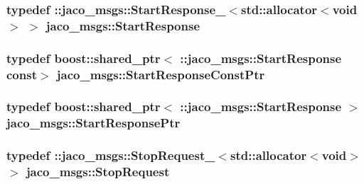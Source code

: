 \subsubsection[{\texorpdfstring{Start\+Response}{StartResponse}}]{\setlength{\rightskip}{0pt plus 5cm}typedef \+::{\bf jaco\+\_\+msgs\+::\+Start\+Response\+\_\+}$<$std\+::allocator$<$void$>$ $>$ {\bf jaco\+\_\+msgs\+::\+Start\+Response}}\hypertarget{namespacejaco__msgs_ab90a2d56175265d26907e49c8a56088d}{}\label{namespacejaco__msgs_ab90a2d56175265d26907e49c8a56088d}
\subsubsection[{\texorpdfstring{Start\+Response\+Const\+Ptr}{StartResponseConstPtr}}]{\setlength{\rightskip}{0pt plus 5cm}typedef boost\+::shared\+\_\+ptr$<$ \+::{\bf jaco\+\_\+msgs\+::\+Start\+Response} const$>$ {\bf jaco\+\_\+msgs\+::\+Start\+Response\+Const\+Ptr}}\hypertarget{namespacejaco__msgs_a619210a150fb5f70e79fa74e741373ec}{}\label{namespacejaco__msgs_a619210a150fb5f70e79fa74e741373ec}
\subsubsection[{\texorpdfstring{Start\+Response\+Ptr}{StartResponsePtr}}]{\setlength{\rightskip}{0pt plus 5cm}typedef boost\+::shared\+\_\+ptr$<$ \+::{\bf jaco\+\_\+msgs\+::\+Start\+Response} $>$ {\bf jaco\+\_\+msgs\+::\+Start\+Response\+Ptr}}\hypertarget{namespacejaco__msgs_a97c77302104b44b1a8b7273e4b2e40f2}{}\label{namespacejaco__msgs_a97c77302104b44b1a8b7273e4b2e40f2}
\subsubsection[{\texorpdfstring{Stop\+Request}{StopRequest}}]{\setlength{\rightskip}{0pt plus 5cm}typedef \+::{\bf jaco\+\_\+msgs\+::\+Stop\+Request\+\_\+}$<$std\+::allocator$<$void$>$ $>$ {\bf jaco\+\_\+msgs\+::\+Stop\+Request}}\hypertarget{namespacejaco__msgs_a7f71a39d70d57c48cf1d0e67cb41d127}{}\label{namespacejaco__msgs_a7f71a39d70d57c48cf1d0e67cb41d127}
